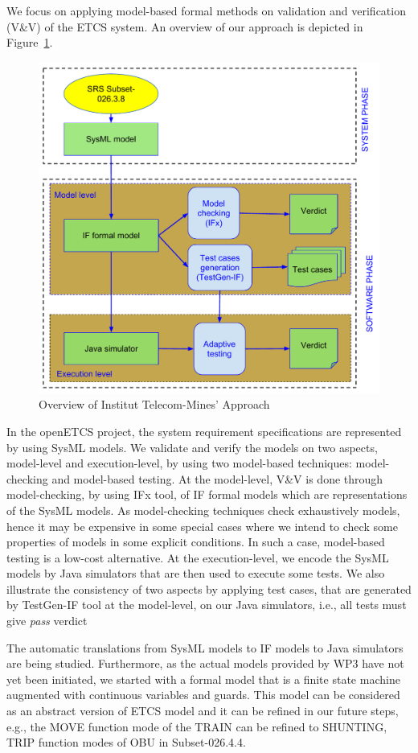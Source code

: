 \documentclass{template/openetcs_article}
\begin{document}
We focus on applying model-based formal methods on validation and verification
(V\&V) of the ETCS system.
An overview of our approach is depicted in Figure~\ref{fig:approach}.

\begin{figure}[!htbp]
\begin{center}
  \includegraphics[width=.7\textwidth]{figures/TSP-approach.pdf}
  \caption{Overview of Institut Telecom-Mines' Approach}
  \label{fig:approach}
\end{center}
\end{figure}


In the openETCS project, the system requirement specifications are represented
by using SysML models. We validate and verify the models on two aspects,
model-level and execution-level, by using two model-based techniques:
model-checking and model-based testing.
At the model-level, V\&V is done through model-checking, by using IFx tool, of
IF formal models which are representations of the SysML models.
As model-checking techniques check exhaustively models, hence it may be
expensive in some special cases where we intend to check some properties of
models in some explicit conditions.
In such a case, model-based testing is a low-cost alternative.
At the execution-level, we encode the SysML models by Java simulators that are
then used to execute some tests.
We also illustrate the consistency of two aspects by applying test cases, that
are generated by TestGen-IF tool at the model-level, on our Java simulators,
i.e., all tests must give {\em pass} verdict

The automatic translations from SysML models to IF models to Java simulators are
being studied. Furthermore, as the actual models provided by WP3 have not yet
been initiated, we started with a formal model that is a finite state machine
augmented with continuous variables and guards. This model can be considered as
an abstract version of ETCS model and it can be refined in our future steps,
e.g., the MOVE function mode of the TRAIN can be refined to SHUNTING,
TRIP function modes of OBU in Subset-026.4.4.
\end{document}
